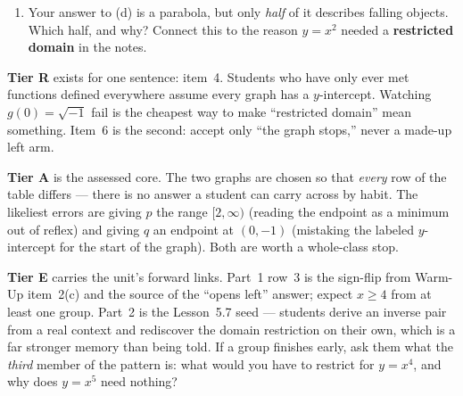 \documentclass[10pt]{article}
\begin{document}
\begin{tcolorbox}[colback=white, colframe=black!40, title=\textbf{Tier E --- Extension},
    fonttitle=\bfseries, arc=1.5mm, left=3mm, right=3mm, top=2mm, bottom=2mm, breakable]
\begin{enumerate}[label=(\alph*), leftmargin=1.9em, itemsep=6pt]
{        takes a time and returns a height. Their graphs are reflections over $y=x$, and their domains
        and ranges are swapped.}
  \item Your answer to (d) is a parabola, but only \emph{half} of it describes falling objects.
        Which half, and why? Connect this to the reason $y=x^2$ needed a \textbf{restricted domain}
        in the notes. 
\end{enumerate}
\end{tcolorbox}

\begin{teachernote}
\textbf{Tier R} exists for one sentence: item~4. Students who have only ever met functions defined
everywhere assume every graph has a $y$-intercept. Watching $g(0)=\sqrt{-1}$ fail is the cheapest way
to make ``restricted domain'' mean something. Item~6 is the second: accept only ``the graph stops,''
never a made-up left arm.

\textbf{Tier A} is the assessed core. The two graphs are chosen so that \emph{every} row of the table
differs --- there is no answer a student can carry across by habit. The likeliest errors are giving
$p$ the range $[2,\infty)$ (reading the endpoint as a minimum out of reflex) and giving $q$ an
endpoint at $(0,-1)$ (mistaking the labeled $y$-intercept for the start of the graph). Both are worth
a whole-class stop.

\textbf{Tier E} carries the unit's forward links. Part~1 row~3 is the sign-flip from Warm-Up item~2(c)
and the source of the ``opens left'' answer; expect $x\ge 4$ from at least one group. Part~2 is the
Lesson~5.7 seed --- students derive an inverse pair from a real context and rediscover the domain
restriction on their own, which is a far stronger memory than being told. If a group finishes early,
ask them what the \emph{third} member of the pattern is: what would you have to restrict for
$y=x^4$, and why does $y=x^5$ need nothing?
\end{teachernote}
\end{document}
